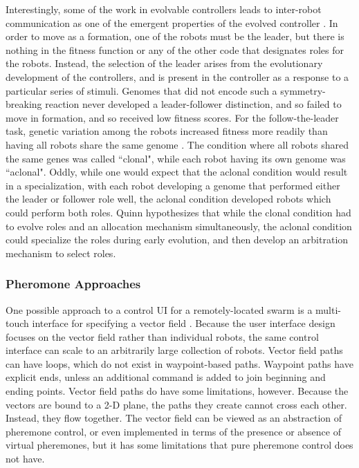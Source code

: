 \documentclass[]{article}
\begin{document}
Interestingly, some of the work in evolvable controllers leads to inter-robot communication as one of the emergent properties of the evolved controller \cite{quinn2001evolving}.
In order to move as a formation, one of the robots must be the leader, but there is nothing in the fitness function or any of the other code that designates roles for the robots. 
Instead, the selection of the leader arises from the evolutionary development of the controllers, and is present in the controller as a response to a particular series of stimuli. 
Genomes that did not encode such a symmetry-breaking reaction never developed a leader-follower distinction, and so failed to move in formation, and so received low fitness scores. 
For the follow-the-leader task, genetic variation among the robots increased fitness more readily than having all robots share the same genome \cite{quinn2001comparison}.
The condition where all robots shared the same genes was called ``clonal", while each robot having its own genome was ``aclonal".
Oddly, while one would expect that the aclonal condition would result in a specialization, with each robot developing a genome that performed either the leader or follower role well, the aclonal condition developed robots which could perform both roles. 
Quinn hypothesizes that while the clonal condition had to evolve roles and an allocation mechanism simultaneously, the aclonal condition could specialize the roles during early evolution, and then develop an arbitration mechanism to select roles.

\subsubsection{Pheromone Approaches}

One possible approach to a control UI for a remotely-located swarm is a multi-touch interface for specifying a vector field \cite{Kato:2009:MIC:1520340.1520500}.
Because the user interface design focuses on the vector field rather than individual robots, the same control interface can scale to an arbitrarily large collection of robots. 
Vector field paths can have loops, which do not exist in waypoint-based paths. 
Waypoint paths have explicit ends, unless an additional command is added to join beginning and ending points. 
Vector field paths do have some limitations, however. 
Because the vectors are bound to a 2-D plane, the paths they create cannot cross each other. 
Instead, they flow together. 
The vector field can be viewed as an abstraction of pheremone control, or even implemented in terms of the presence or absence of virtual pheremones, but it has some limitations that pure pheremone control does not have.
\end{document}
